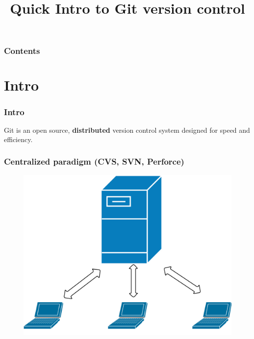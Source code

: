 \documentclass{beamer}
\title{Quick Intro to Git version control}
\begin{document}
\begin{frame}
    \titlepage
\end{frame}

\begin{frame}
    \frametitle{Contents}
    \tableofcontents[hideallsubsections]
\end{frame}

\section{Intro}

\begin{frame}
    \frametitle{Intro}
    \begin{center}
        Git is an open source, \textbf{distributed} version control
        system designed for speed and efficiency.
    \end{center}
\end{frame}

\begin{frame}
    \frametitle{Centralized paradigm (CVS, SVN, Perforce)}
    \begin{figure}[h!]
        \begin{center}
            \includegraphics[scale=0.175]{centralized.png}
        \end{center}
    \end{figure}
\end{frame}
\end{document}
